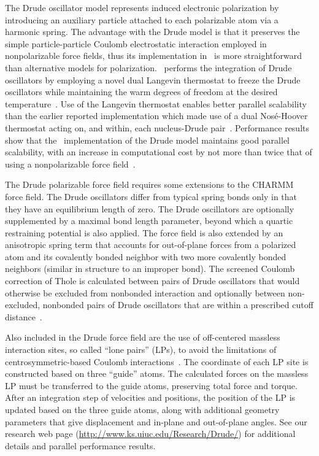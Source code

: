 The Drude oscillator model represents induced electronic polarization 
by introducing an auxiliary particle attached to each polarizable 
atom via a harmonic spring.  The advantage with the Drude model is 
that it preserves the simple particle-particle Coulomb electrostatic 
interaction employed in nonpolarizable force fields, 
thus its implementation in \NAMD\ is more straightforward than 
alternative models for polarization.  
\NAMD\ performs the integration of Drude oscillators 
by employing a novel dual Langevin thermostat to freeze the Drude 
oscillators while maintaining the warm degrees of freedom 
at the desired temperature~\cite{JIAN2011}.  
Use of the Langevin thermostat enables better parallel scalability 
than the earlier reported implementation which made use of 
a dual Nos\'e-Hoover thermostat acting on, and within,
each nucleus-Drude pair~\cite{Lamoureux-2003a}.  
Performance results 
show that the \NAMD\ implementation of the Drude model maintains good 
parallel scalability, 
with an increase in computational cost by not more than twice 
that of using a nonpolarizable force field~\cite{JIAN2011}.  

The Drude polarizable force field requires some extensions to the
CHARMM force field.  
The Drude oscillators differ from typical spring bonds only in that they 
have an equilibrium length of zero.  
The Drude oscillators are optionally supplemented by a maximal 
bond length parameter, beyond which a quartic restraining potential 
is also applied.  
The force field is also extended by an anisotropic spring term 
that accounts for out-of-plane forces from a polarized atom and its 
covalently bonded neighbor with two more covalently bonded 
neighbors (similar in structure to an improper bond).  
The screened Coulomb correction of Thole is calculated between 
pairs of Drude oscillators that would otherwise be excluded from 
nonbonded interaction and 
optionally between non-excluded, nonbonded pairs of Drude oscillators 
that are within a prescribed cutoff distance~\cite{Thole81,van1998molecular}.  

Also included in the Drude force field 
are the use of off-centered massless interaction sites, 
so called ``lone pairs'' (LPs),
to avoid the limitations 
of centrosymmetric-based Coulomb interactions~\cite{Harder2006}.  
The coordinate of each LP site is constructed based on three ``guide'' atoms.
The calculated forces on the massless LP must be transferred 
to the guide atoms, 
preserving total force and torque.  
After an integration step of velocities and positions, 
the position of the LP is updated based on the three guide atoms, 
along with additional geometry parameters that give displacement 
and in-plane and out-of-plane angles.  
See our research web page
(\url{http://www.ks.uiuc.edu/Research/Drude/})
for additional details and parallel performance results.  


